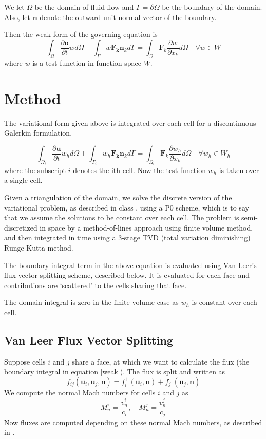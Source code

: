 \documentclass[letterpaper,twoside,12pt]{article}
\begin{document}
We let $\Omega$ be the domain of fluid flow and $\Gamma = \partial\Omega$ be the boundary of the domain. Also, let $\mathbf{n}$ denote the outward unit normal vector of the boundary.

Then the weak form of the governing equation is
\begin{equation}
\int_{\Omega} \frac{\partial \mathbf{u}}{\partial t}wd\Omega + \int_{\Gamma} w\mathbf{F_k}\mathbf{n}_k d\Gamma = \int_{\Omega} \mathbf{F}_k \frac{\partial w}{\partial x_k}d\Omega \quad \forall w \in W
\end{equation}
where $w$ is a test function in function space $W$.

\section{Method}

The variational form given above is integrated over each cell for a discontinuous Galerkin formulation.

\begin{equation}
\int_{\Omega_i} \frac{\partial \mathbf{u}}{\partial t}w_h d\Omega + \int_{\Gamma_i} w_h \mathbf{F_k}\mathbf{n}_k d\Gamma = \int_{\Omega_i} \mathbf{F}_k \frac{\partial w_h}{\partial x_k}d\Omega \quad \forall w_h \in W_h \label{weak}
\end{equation}
where the subscript $i$ denotes the ith cell. Now the test function $w_h$ is taken over a single cell.

Given a triangulation of the domain, we solve the discrete version of the variational problem, as described in class \cite{luo}, using a P0 scheme, which is to say that we assume the solutions to be constant over each cell. The problem is semi-discretized in space by a method-of-lines approach using finite volume method, and then integrated in time using a 3-stage TVD (total variation diminishing) Runge-Kutta method.

The boundary integral term in the above equation is evaluated using Van Leer's flux vector splitting scheme, described below. It is evaluated for each face and contributions are `scattered' to the cells sharing that face.

The domain integral is zero in the finite volume case as $w_h$ is constant over each cell.

\subsection{Van Leer Flux Vector Splitting}
Suppose cells $i$ and $j$ share a face, at which we want to calculate the flux (the boundary integral in equation \eqref{weak}). The flux is split and written as
\begin{equation}
f_{ij}(\mathbf{u}_i, \mathbf{u}_j, \mathbf{n}) = f_i^+(\mathbf{u}_i, \mathbf{n}) + f_j^-(\mathbf{u}_j, \mathbf{n})
\end{equation}
We compute the normal Mach numbers for cells $i$ and $j$ as
\[ M_n^i = \frac{v_n^i}{c_i}, \quad M_n^j = \frac{v_n^j}{c_j} \]
Now fluxes are computed depending on these normal Mach numbers, as described in \cite{luo}.
\end{document}
